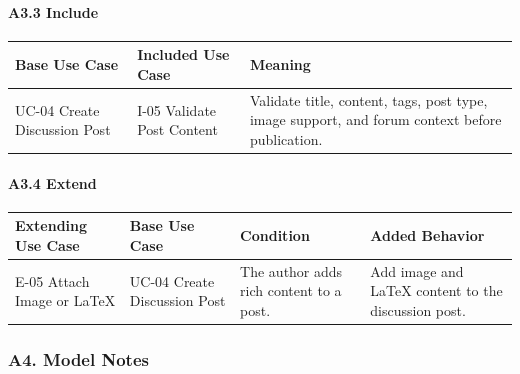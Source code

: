 \documentclass[12pt]{article}
\renewcommand{\baselinestretch}{1.5}
\begin{document}
\hypertarget{sec:a3-3-include}{}
\paragraph*{A3.3 Include}
\par\medskip

\begingroup
\small
\renewcommand{\baselinestretch}{1.0}\selectfont
\renewcommand{\arraystretch}{1.15}
\setlength{\tabcolsep}{6pt}
\begin{longtable}{|>{\raggedright\arraybackslash}p{}|>{\raggedright\arraybackslash}p{}|>{\raggedright\arraybackslash}p{}|}
\hline
\textbf{Base Use Case} & \textbf{Included Use Case} & \textbf{Meaning} \\ \hline
\endhead
UC-04 Create Discussion Post & I-05 Validate Post Content & Validate title, content, tags, post type, image support, and forum context before publication. \\ \hline
\end{longtable}
\endgroup
\par\medskip

\hypertarget{sec:a3-4-extend}{}
\paragraph*{A3.4 Extend}
\par\medskip

\begingroup
\small
\renewcommand{\baselinestretch}{1.0}\selectfont
\renewcommand{\arraystretch}{1.15}
\setlength{\tabcolsep}{6pt}
\begin{longtable}{|>{\raggedright\arraybackslash}p{}|>{\raggedright\arraybackslash}p{}|>{\raggedright\arraybackslash}p{}|>{\raggedright\arraybackslash}p{}|}
\hline
\textbf{Extending Use Case} & \textbf{Base Use Case} & \textbf{Condition} & \textbf{Added Behavior} \\ \hline
\endhead
E-05 Attach Image or LaTeX & UC-04 Create Discussion Post & The author adds rich content to a post. & Add image and LaTeX content to the discussion post. \\ \hline
\end{longtable}
\endgroup
\par\medskip

\hypertarget{sec:a4-model-notes}{}
\subsubsection*{A4. Model Notes}
\par\medskip
\end{document}
